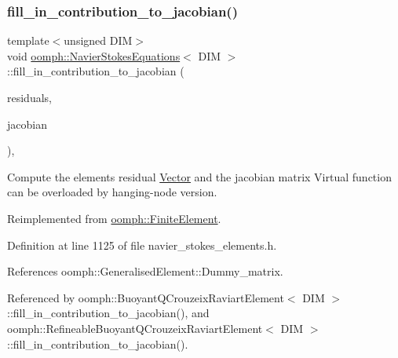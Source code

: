 \mbox{\label{classoomph_1_1NavierStokesEquations_aba9a7da719632a9003d2358e64713241}} 
\subsubsection{\texorpdfstring{fill\+\_\+in\+\_\+contribution\+\_\+to\+\_\+jacobian()}{fill\_in\_contribution\_to\_jacobian()}}
{\footnotesize\ttfamily template$<$unsigned D\+IM$>$ \\
void \hyperlink{classoomph_1_1NavierStokesEquations}{oomph\+::\+Navier\+Stokes\+Equations}$<$ D\+IM $>$\+::fill\+\_\+in\+\_\+contribution\+\_\+to\+\_\+jacobian (\begin{DoxyParamCaption}\item[{\hyperlink{classoomph_1_1Vector}{Vector}$<$ double $>$ \&}]{residuals,  }\item[{\hyperlink{classoomph_1_1DenseMatrix}{Dense\+Matrix}$<$ double $>$ \&}]{jacobian }\end{DoxyParamCaption})\hspace{0.3cm}{\ttfamily [inline]}, {\ttfamily [virtual]}}



Compute the element\textquotesingle{}s residual \hyperlink{classoomph_1_1Vector}{Vector} and the jacobian matrix Virtual function can be overloaded by hanging-\/node version. 



Reimplemented from \hyperlink{classoomph_1_1FiniteElement_a0ae7af222af38a0d53bf283dc85bdfea}{oomph\+::\+Finite\+Element}.



Definition at line 1125 of file navier\+\_\+stokes\+\_\+elements.\+h.



References oomph\+::\+Generalised\+Element\+::\+Dummy\+\_\+matrix.



Referenced by oomph\+::\+Buoyant\+Q\+Crouzeix\+Raviart\+Element$<$ D\+I\+M $>$\+::fill\+\_\+in\+\_\+contribution\+\_\+to\+\_\+jacobian(), and oomph\+::\+Refineable\+Buoyant\+Q\+Crouzeix\+Raviart\+Element$<$ D\+I\+M $>$\+::fill\+\_\+in\+\_\+contribution\+\_\+to\+\_\+jacobian().

